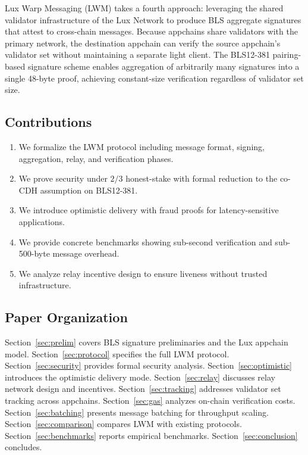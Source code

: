 \documentclass[11pt,a4paper]{article}
\begin{document}
Lux Warp Messaging (LWM) takes a fourth approach: leveraging the shared validator infrastructure of the Lux Network to produce BLS aggregate signatures that attest to cross-chain messages. Because appchains share validators with the primary network, the destination appchain can verify the source appchain's validator set without maintaining a separate light client. The BLS12-381 pairing-based signature scheme \cite{boneh2001bls, boneh2018compact} enables aggregation of arbitrarily many signatures into a single 48-byte proof, achieving constant-size verification regardless of validator set size.

\subsection{Contributions}

\begin{enumerate}[label=(\roman*)]
    \item We formalize the LWM protocol including message format, signing, aggregation, relay, and verification phases.
    \item We prove security under $2/3$ honest-stake with formal reduction to the co-CDH assumption on BLS12-381.
    \item We introduce optimistic delivery with fraud proofs for latency-sensitive applications.
    \item We provide concrete benchmarks showing sub-second verification and sub-500-byte message overhead.
    \item We analyze relay incentive design to ensure liveness without trusted infrastructure.
\end{enumerate}

\subsection{Paper Organization}

Section~\ref{sec:prelim} covers BLS signature preliminaries and the Lux appchain model. Section~\ref{sec:protocol} specifies the full LWM protocol. Section~\ref{sec:security} provides formal security analysis. Section~\ref{sec:optimistic} introduces the optimistic delivery mode. Section~\ref{sec:relay} discusses relay network design and incentives. Section~\ref{sec:tracking} addresses validator set tracking across appchains. Section~\ref{sec:gas} analyzes on-chain verification costs. Section~\ref{sec:batching} presents message batching for throughput scaling. Section~\ref{sec:comparison} compares LWM with existing protocols. Section~\ref{sec:benchmarks} reports empirical benchmarks. Section~\ref{sec:conclusion} concludes.
\end{document}
